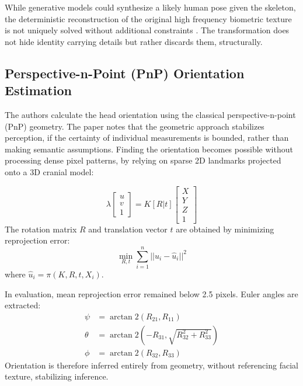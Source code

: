 \documentclass[conference]{IEEEtran}
\begin{document}
While generative models could synthesize a likely human pose given the skeleton, the deterministic reconstruction of the original high frequency biometric texture is not uniquely solved without additional constraints \cite{b18}. The transformation does not hide identity carrying details but rather discards them, structurally.

\subsection{Perspective-n-Point (PnP) Orientation Estimation}
The authors calculate the head orientation using the classical perspective-n-point (PnP) geometry. The paper notes that the geometric approach stabilizes perception, if the certainty of individual measurements is bounded, rather than making semantic assumptions. Finding the orientation becomes possible without processing dense pixel patterns, by relying on sparse 2D landmarks projected onto a 3D cranial model:

\begin{equation}
\lambda \begin{bmatrix} u \\ v \\ 1 \end{bmatrix} = K [R | t] \begin{bmatrix} X \\ Y \\ Z \\ 1 \end{bmatrix}
\end{equation}
The rotation matrix $R$ and translation vector $t$ are obtained by minimizing reprojection error:
\begin{equation}
\min_{R, t} \sum_{i=1}^{n} || u_i - \hat{u}_i ||^2
\end{equation}
where $\hat{u}_i = \pi(K, R, t, X_i)$.

In evaluation, mean reprojection error remained below 2.5 pixels. Euler angles are extracted:
\begin{align}
\psi &= \arctan2(R_{21}, R_{11}) \\
\theta &= \arctan2(-R_{31}, \sqrt{R_{32}^2 + R_{33}^2}) \\
\phi &= \arctan2(R_{32}, R_{33})
\end{align}
Orientation is therefore inferred entirely from geometry, without referencing facial texture, stabilizing inference.
\end{document}

